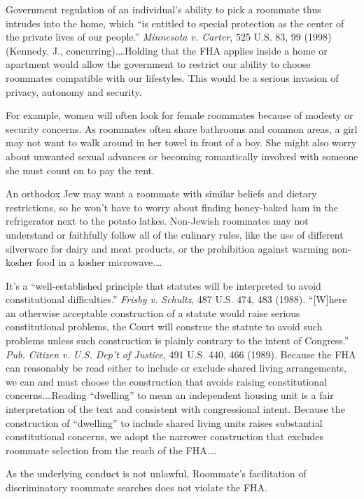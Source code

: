Government regulation of an individual's ability to pick a roommate thus
intrudes into the home, which ``is entitled to special protection as the center
of the private lives of our people.'' \emph{Minnesota v. Carter}, 525 U.S. 83,
99 (1998) (Kennedy, J., concurring).\ldots Holding that the FHA applies inside a
home or apartment would allow the government to restrict our ability to choose
roommates compatible with our lifestyles. This would be a serious invasion of
privacy, autonomy and security.

For example, women will often look for female roommates because of modesty or
security concerns. As roommates often share bathrooms and common areas, a girl
may not want to walk around in her towel in front of a boy. She might also
worry about unwanted sexual advances or becoming romantically involved with
someone she must count on to pay the rent.

An orthodox Jew may want a roommate with similar beliefs and dietary
restrictions, so he won't have to worry about finding honey-baked ham in the
refrigerator next to the potato latkes. Non-Jewish roommates may not understand
or faithfully follow all of the culinary rules, like the use of different
silverware for dairy and meat products, or the prohibition against warming
non-kosher food in a kosher microwave.\ldots

It's a ``well-established principle that statutes will be interpreted to avoid
constitutional difficulties.'' \emph{Frisby v. Schultz}, 487 U.S. 474, 483
(1988).
``[W]here an otherwise acceptable construction of a statute would raise serious
constitutional problems, the Court will construe the statute to avoid such
problems unless such construction is plainly contrary to the intent of
Congress.'' \textit{Pub. Citizen v. U.S. Dep't of Justice}, 491 U.S. 440, 466
(1989). Because the FHA can reasonably be read either to include or exclude
shared living arrangements, we can and must choose the construction that avoids
raising constitutional concerns.\ldots Reading ``dwelling'' to mean an
independent housing unit is a fair interpretation of the text and consistent
with congressional intent. Because the construction of ``dwelling'' to include
shared living units raises substantial constitutional concerns, we adopt the
narrower construction that excludes roommate selection from the reach of the
FHA.\ldots

As the underlying conduct is not unlawful, Roommate's facilitation of
discriminatory roommate searches does not violate the FHA.

